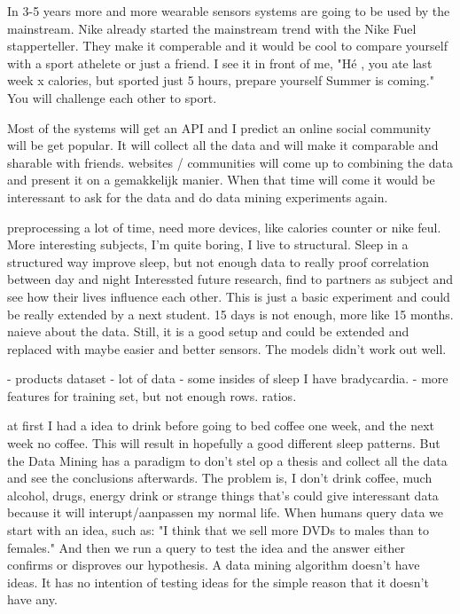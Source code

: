 	In 3-5 years more and more wearable sensors systems are going to be used by the mainstream. Nike already started the mainstream trend with the Nike Fuel stapperteller. They make it comperable and it would be cool to compare yourself with a sport athelete or just a friend. I see it in front of me, "Hé , you ate last week x calories, but sported just 5 hours, prepare yourself Summer is coming." You will challenge each other to sport. 

	Most of the systems will get an API and I predict an online social community will be get popular. It will collect all the data and will make it comparable and sharable with friends. 
	websites / communities will come up to combining the data and present it on a gemakkelijk manier. When that time will come it would be interessant to ask for the data and do data mining experiments again. 

	\iffalse
	preprocessing a lot of time, 
	need more devices, like calories counter or nike feul.
	More interesting subjects, I'm quite boring, I live to structural.
	Sleep in a structured way improve sleep, 
		but not enough data to really proof correlation between day and night
	Interessted future research, find to partners as subject and see how their lives influence each other.
	This is just a basic experiment and could be really extended by a next student.
	15 days is not enough, more like 15 months. 
	naieve about the data. 
	Still, it is a good setup and could be extended and replaced with maybe easier and better sensors. 
 The models didn't work out well.


	- products dataset
	- lot of data
	-  some insides of sleep
	I have bradycardia. 
	- more features for training set, but not enough rows. ratios.

	at first I had a idea to drink before going to bed coffee one week, and the next week no coffee. This will result in hopefully a good different sleep patterns. But the Data Mining has a paradigm to don't stel op a thesis and collect all the data and see the conclusions afterwards. The problem is, I don't drink coffee, much alcohol, drugs, energy drink or strange things that's could give interessant data because it will interupt/aanpassen my normal life. 
When humans query data we start with an idea, such as: "I think that we sell more DVDs to males than to females." And then we run a query to test the idea and the answer either confirms or disproves our hypothesis. A data mining algorithm doesn't have ideas. It has no intention of testing ideas for the simple reason that it doesn't have any.

